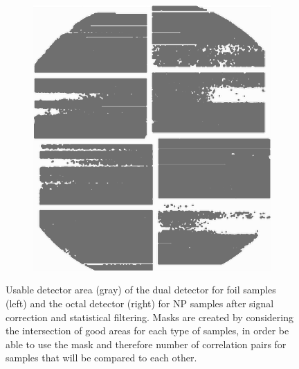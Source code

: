 \begin{figure}
\begin{subfigure}{0.3\textwidth}
		\includegraphics[width=\linewidth]{images/mask_octal.png}
	\end{subfigure}
	\caption[Usable detector area]{Usable detector area (gray) of the dual detector for foil samples (left) and the octal detector (right) for NP samples after signal correction and statistical filtering. Masks are created by considering the intersection of good areas for each type of samples, in order be able to use the mask and therefore number of correlation pairs for samples that will be compared to each other.}	
	\label{fig:mask}
\end{figure}

